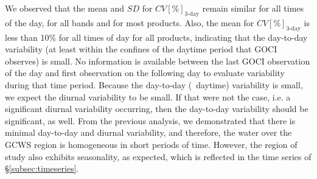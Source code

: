 \documentclass[remotesensing,article,submit,moreauthors,pdftex,10pt,a4paper]{Definitions/mdpi}
\begin{document}
We observed that the mean and $SD$ for $CV[\%]_\text{3-day}$ remain similar for all times of the day, for all bands and for most products. Also, the mean for $CV[\%]_\text{3-day}$ is less than 10\% for all times of day for all products, indicating that the day-to-day variability (at least within the confines of the daytime period that GOCI observes) is small. No information is available between the last GOCI observation of the day and first observation on the following day to evaluate variability during that time period.  Because the day-to-day (~daytime) variability is small, we expect the diurnal variability to be small. If that were not the case, i.e. a significant diurnal variability occurring, then the day-to-day variability should be significant, as well. From the previous analysis, we demonstrated that there is minimal day-to-day and diurnal variability, and therefore, the water over the GCWS region is homogeneous in short periods of time. However, the region of study also exhibits seasonality, as expected, which is reflected in the time series of \S\ref{subsec:timeseries}. 
\end{document}
